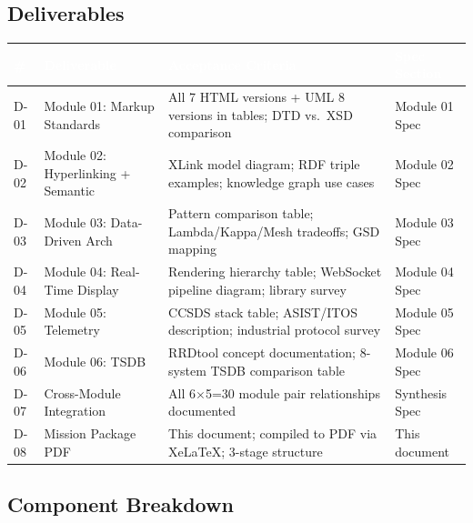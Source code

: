 \documentclass[11pt,letterpaper]{article}
\newcommand{\tableheader}[1]{\textbf{\sffamily\textcolor{white}{#1}}}
\begin{document}
\subsection{Deliverables}

\begin{center}
\begin{tabularx}{\textwidth}{C{0.6cm}L{3.5cm}L{3.5cm}X}
\toprule
{}
\tableheader{\#} & \tableheader{Deliverable} & \tableheader{Acceptance Criteria} & \tableheader{Spec Section} \\
\midrule
D-01 & Module 01: Markup Standards & All 7 HTML versions + UML 8 versions in tables; DTD vs.\ XSD comparison & Module 01 Spec \\
D-02 & Module 02: Hyperlinking + Semantic & XLink model diagram; RDF triple examples; knowledge graph use cases & Module 02 Spec \\
D-03 & Module 03: Data-Driven Arch & Pattern comparison table; Lambda/Kappa/Mesh tradeoffs; GSD mapping & Module 03 Spec \\
D-04 & Module 04: Real-Time Display & Rendering hierarchy table; WebSocket pipeline diagram; library survey & Module 04 Spec \\
D-05 & Module 05: Telemetry & CCSDS stack table; ASIST/ITOS description; industrial protocol survey & Module 05 Spec \\
D-06 & Module 06: TSDB & RRDtool concept documentation; 8-system TSDB comparison table & Module 06 Spec \\
D-07 & Cross-Module Integration & All 6$\times$5=30 module pair relationships documented & Synthesis Spec \\
D-08 & Mission Package PDF & This document; compiled to PDF via XeLaTeX; 3-stage structure & This document \\
\bottomrule
\end{tabularx}
\end{center}

\subsection{Component Breakdown}
\end{document}
